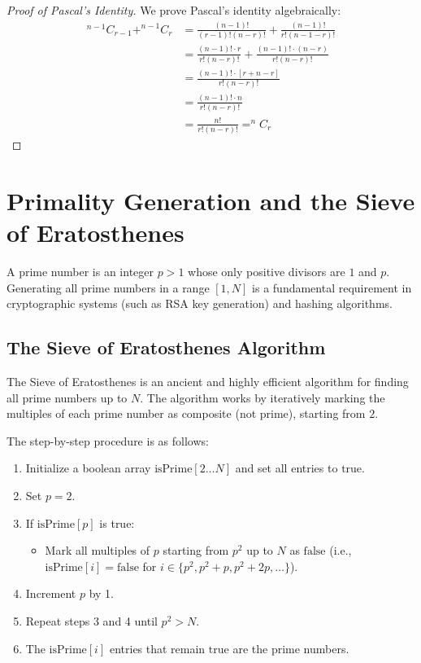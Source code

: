 \documentclass[10pt,journal,compsoc,onecolumn]{IEEEtran}
\begin{document}
\begin{proof}[Proof of Pascal's Identity]
We prove Pascal's identity algebraically:
\begin{align*}
^{n-1}C_{r-1} + ^{n-1}C_r &= \frac{(n-1)!}{(r-1)!(n-r)!} + \frac{(n-1)!}{r!(n-1-r)!} \\
&= \frac{(n-1)! \cdot r}{r!(n-r)!} + \frac{(n-1)! \cdot (n-r)}{r!(n-r)!} \\
&= \frac{(n-1)! \cdot [r + n - r]}{r!(n-r)!} \\
&= \frac{(n-1)! \cdot n}{r!(n-r)!} \\
&= \frac{n!}{r!(n-r)!} = ^nC_r
\end{align*}
\end{proof}

\section{Primality Generation and the Sieve of Eratosthenes}
\label{sec:primes}

A prime number is an integer $p > 1$ whose only positive divisors are $1$ and $p$. Generating all prime numbers in a range $[1, N]$ is a fundamental requirement in cryptographic systems (such as RSA key generation) and hashing algorithms.

\subsection{The Sieve of Eratosthenes Algorithm}
The Sieve of Eratosthenes is an ancient and highly efficient algorithm for finding all prime numbers up to $N$. The algorithm works by iteratively marking the multiples of each prime number as composite (not prime), starting from $2$.

The step-by-step procedure is as follows:
\begin{enumerate}
    \item Initialize a boolean array $\text{isPrime}[2 \dots N]$ and set all entries to $\text{true}$.
    \item Set $p = 2$.
    \item If $\text{isPrime}[p]$ is true:
    \begin{itemize}
        \item Mark all multiples of $p$ starting from $p^2$ up to $N$ as $\text{false}$ (i.e., $\text{isPrime}[i] = \text{false}$ for $i \in \{p^2, p^2+p, p^2+2p, \dots\}$).
    \end{itemize}
    \item Increment $p$ by 1.
    \item Repeat steps 3 and 4 until $p^2 > N$.
    \item The $\text{isPrime}[i]$ entries that remain $\text{true}$ are the prime numbers.
\end{enumerate}
\end{document}
